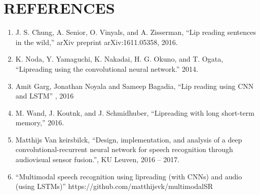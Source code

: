 \documentclass{article}
\begin{document}
\section{REFERENCES}
\begin{enumerate}
\item J. S. Chung, A. Senior, O. Vinyals, and A. Zisserman, “Lip reading sentences in the wild,” arXiv preprint arXiv:1611.05358, 2016.
\item K. Noda, Y. Yamaguchi, K. Nakadai, H. G. Okuno, and T. Ogata, “Lipreading using the convolutional neural network.” 2014.
\item Amit Garg, Jonathan Noyala and Sameep Bagadia, “Lip reading using CNN and LSTM” , 2016
\item M. Wand, J. Koutnk, and J. Schmidhuber, “Lipreading with long short-term memory,” 2016.
\item Matthijs Van keirsbilck, “Design, implementation, and analysis of a deep convolutional-recurrent neural network for speech recognition through audiovisual sensor fusion.”, KU Leuven, 2016 – 2017.
\item “Multimodal speech recognition using lipreading (with CNNs) and audio (using LSTMs)” https://github.com/matthijsvk/multimodalSR
\end{enumerate}





\end{document}
